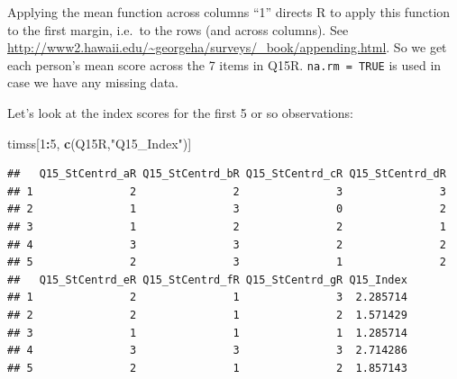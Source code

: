 \documentclass[
]{article}
\newenvironment{Shaded}{\begin{snugshade}}{\end{snugshade}}
\newcommand{\DataTypeTok}[1]{\textcolor[rgb]{0.13,0.29,0.53}{#1}}
\newcommand{\DecValTok}[1]{\textcolor[rgb]{0.00,0.00,0.81}{#1}}
\newcommand{\KeywordTok}[1]{\textcolor[rgb]{0.13,0.29,0.53}{\textbf{#1}}}
\newcommand{\NormalTok}[1]{#1}
\newcommand{\OperatorTok}[1]{\textcolor[rgb]{0.81,0.36,0.00}{\textbf{#1}}}
\newcommand{\OtherTok}[1]{\textcolor[rgb]{0.56,0.35,0.01}{#1}}
\newcommand{\StringTok}[1]{\textcolor[rgb]{0.31,0.60,0.02}{#1}}
\begin{document}
\begin{Shaded}
\end{Shaded}

Applying the mean function across columns ``1'' directs R to apply this function to the first margin, i.e.~to the rows (and across columns). See \url{http://www2.hawaii.edu/~georgeha/surveys/_book/appending.html}.
So we get each person's mean score across the 7 items in Q15R. \texttt{na.rm\ =\ TRUE} is used in case we have any missing data.

Let's look at the index scores for the first 5 or so observations:

\begin{Shaded}
\begin{Highlighting}[]
\NormalTok{timss[}\DecValTok{1}\OperatorTok{:}\DecValTok{5}\NormalTok{, }\KeywordTok{c}\NormalTok{(Q15R,}\StringTok{"Q15_Index"}\NormalTok{)]  }
\end{Highlighting}
\end{Shaded}

\begin{verbatim}
##   Q15_StCentrd_aR Q15_StCentrd_bR Q15_StCentrd_cR Q15_StCentrd_dR
## 1               2               2               3               3
## 2               1               3               0               2
## 3               1               2               2               1
## 4               3               3               2               2
## 5               2               3               1               2
##   Q15_StCentrd_eR Q15_StCentrd_fR Q15_StCentrd_gR Q15_Index
## 1               2               1               3  2.285714
## 2               2               1               2  1.571429
## 3               1               1               1  1.285714
## 4               3               3               3  2.714286
## 5               2               1               2  1.857143
\end{verbatim}

\begin{Shaded}
\end{Shaded}
\end{document}
